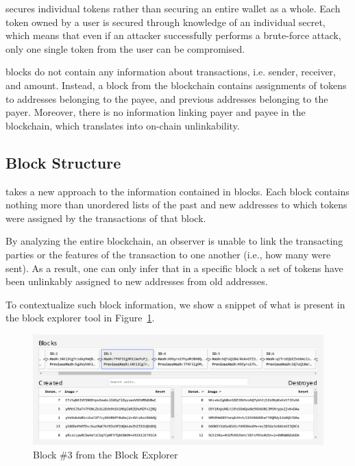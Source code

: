 \name secures individual tokens rather than securing an entire wallet as a whole. Each token owned by a user is secured through knowledge of an individual secret, which means that even if an attacker successfully performs a brute-force attack, only one single token from the user can be compromised.

\name blocks do not contain any information about transactions, i.e. sender, receiver, and amount. Instead, a block from the \name blockchain contains assignments of tokens to addresses belonging to the payee, and previous addresses belonging to the payer. Moreover, there is no information linking payer and payee in the blockchain, which translates into on-chain unlinkability. 

\subsection{Block Structure}

\name takes a new approach to the information contained in blocks. Each block contains nothing more than unordered lists of the past and new addresses to which tokens were assigned by the transactions of that block.

By analyzing the entire blockchain, an observer is unable to link the transacting parties or the features of the transaction to one another (i.e., how many were sent).  As a result, one can only infer that in a specific block a set of tokens have been unlinkably assigned to new addresses from old addresses.

To contextualize such block information, we show a snippet of what is present in the \name block explorer tool in Figure~\ref{fig:block_explorer}.

\begin{figure}[H]
    \centering
    \includegraphics[width=\textwidth]{img/Block-Explorer.pdf}
    \caption{Block \#3 from the \name Block Explorer}
    \label{fig:block_explorer}
\end{figure}

